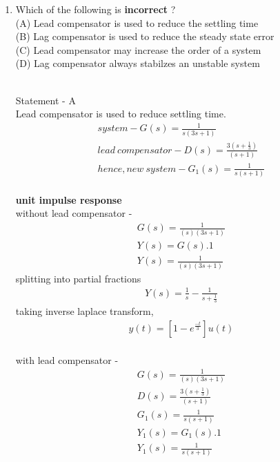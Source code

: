 \begin{enumerate}[label=\thesection.\arabic*.,ref=\thesection.\theenumi]
\item Which of the following is \textbf{incorrect} ?\\
(A) Lead compensator is used to reduce the settling time\\
(B) Lag compensator is used to reduce the steady state error\\
(C) Lead compensator may increase the order of a system\\
(D) Lag compensator always stabilzes an unstable system\\
\\
\solution 

Statement - A\\Lead compensator is used to reduce settling time.
\begin{align}
system-G(s) = \frac{1}{s(3s+1)}\\
lead\ compensator-D(s) = \frac{3(s+\frac{1}{3})}{(s+1)} \\
hence, new\ system-G_{1}(s) = \frac{1}{s(s+1)}
\end{align}
\\
\textbf{unit impulse response}\\
without lead compensator - \\
\begin{align}
G(s) = \frac{1}{(s)(3s+1)}\\
Y(s) = G(s).1\\
Y(s) = \frac{1}{(s)(3s+1)}
\end{align}
splitting into partial fractions\\
\begin{align}
Y(s) = \frac{1}{s} - \frac{1}{s+\frac{1}{3}}
\end{align}
taking inverse laplace transform, \\
\begin{align}
y(t) = [ 1 - e^{\frac{-t}{3}}]u(t)
\end{align}
\\
with lead compensator - \\
\begin{align}
G(s) = \frac{1}{(s)(3s+1)}\\
D(s) = \frac{3(s+\frac{1}{3})}{(s+1)} \\
G_{1}(s) = \frac{1}{s(s+1)}\\
Y_{1}(s) = G_{1}(s).1\\
Y_{1}(s) = \frac{1}{s(s+1)}
\end{align}

\end{enumerate}
